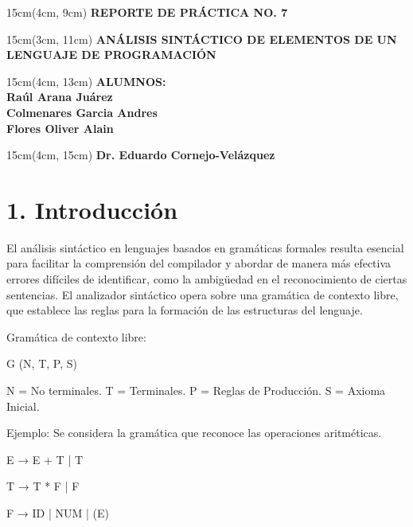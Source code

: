 \documentclass{article}
\begin{document}
\BgThispage
\-
\begin{textblock*}{15cm}(4cm, 9cm)
    {\fontsize{30pt}{16pt}\selectfont
    \textcolor{rojo}{\textbf{REPORTE DE PRÁCTICA NO. 7}}
    }
\end{textblock*}

\begin{textblock*}{15cm}(3cm, 11cm)
    {\fontsize{15pt}{16pt}\selectfont
    \centering
    \textcolor{rojo}{\textbf{ANÁLISIS SINTÁCTICO DE ELEMENTOS DE UN LENGUAJE DE PROGRAMACIÓN}}
    }
\end{textblock*}

\begin{textblock*}{15cm}(4cm, 13cm)
    {\fontsize{13pt}{16pt}\selectfont
    \textcolor{rojo}{\textbf{ALUMNOS: \\ Raúl Arana Juárez \\
    Colmenares Garcia Andres\\
    Flores Oliver Alain
    }}
    }
\end{textblock*}

\begin{textblock*}{15cm}(4cm, 15cm)
    {\fontsize{11pt}{16pt}\selectfont
    \textcolor{rojo}{\textbf{Dr. Eduardo Cornejo-Velázquez}}
    }
\end{textblock*}

\newpage

\section{1. Introducción}

El análisis sintáctico en lenguajes basados en gramáticas formales resulta esencial para facilitar la 
comprensión del compilador y abordar de manera más efectiva errores difíciles de identificar, como la 
ambigüedad en el reconocimiento de ciertas sentencias. El analizador sintáctico opera sobre una gramática 
de contexto libre, que establece las reglas para la formación de las estructuras del lenguaje. 

Gramática de contexto libre:  

G (N, T, P, S) 

N = No terminales.  
T = Terminales.  
P = Reglas de Producción.  
S = Axioma Inicial.  

Ejemplo: Se considera la gramática que reconoce las operaciones aritméticas.  

E → E + T  
| T  

T → T * F  
| F  

F → ID  
| NUM  
| (E)  
\end{document}
